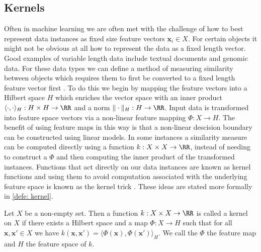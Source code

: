 \subsection*{Kernels}\label{Section1.1}

Often in machine learning we are often met with the challenge of how to best represent data instances as fixed size feature vectors $\bm{x}_i \in X$. For certain objects it might not be obvious at all how to represent the data as a fixed length vector. Good examples of variable length data include textual documents and genomic data. For these data types we can define a method of measuring similarity between objects which requires them to first be converted to a fixed length feature vector first \cite{MurphyKevinP2012Ml}. To do this we begin by mapping the feature vectors into a Hilbert space $H$ which enriches the vector space with an inner product $\langle \cdot , \cdot \rangle_H : H \times H \to \RR$ and a norm $\| \cdot \|_H : H \to \RR$. Input data is transformed into feature space vectors via a non-linear feature mapping $\Phi : X \to H$. The benefit of using feature maps in this way is that a non-linear descision boundary can be constructed using linear models. In some instances a similarity measure can be computed directly using a function $k : X \times X \to \RR$, instead of needing to construct a $\Phi$ and then computing the inner product of the transformed instances. Functions that act directly on our data instances are known as kernel functions and using them to avoid computation associated with the underlying feature space is known as the kernel trick \cite{SteinwartIngo2008SVMb}. These ideas are stated more formally in \cref{defe: kernel}.

\begin{defe}[Kernel] \label{defe: kernel}
    Let $X$ be a non-empty set. Then a function $k : X \times X \to \RR$ is called a kernel on $X$ if there exists a Hilbert space and a map $\Phi : X \to H$ such that for all $\bm{x} , \bm{x}' \in X$ we have $k \left( \bm{x} , \bm{x}' \right) = \langle \Phi \left( \bm{x} \right), \Phi \left( \bm{x}' \right) \rangle_H$. We call the $\Phi$ the feature map and $H$ the feature space of $k$.
\end{defe}

